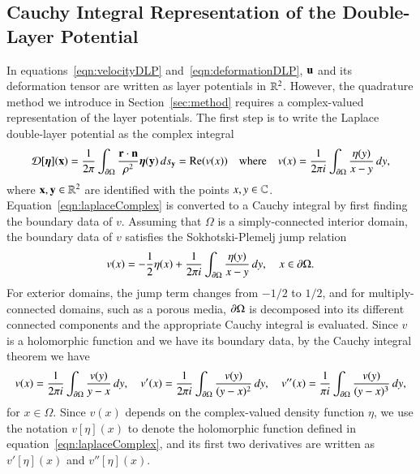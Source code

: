 \documentclass[preprint,10pt]{elsarticle}
\begin{document}
\subsection{Cauchy Integral Representation of the Double-Layer
Potential}
\label{sec:DLPcomplex}
In equations~\eqref{eqn:velocityDLP} and~\eqref{eqn:deformationDLP},
${\mathbf{u}}$ and its deformation tensor are written as layer potentials in
${\mathbb{R}}^2$.  However, the quadrature method we introduce in
Section~\ref{sec:method} requires a complex-valued representation of the
layer potentials. The first step is to write the Laplace double-layer
potential as the complex integral
\begin{align}
  {\mathcal{D}}[{\boldsymbol\eta}]({\mathbf{x}}) = \frac{1}{2\pi} \int_{{\partial}\Omega} 
    \frac{{\mathbf{r}} \cdot {\mathbf{n}}}{\rho^2}{\boldsymbol\eta}({\mathbf{y}})\, ds_{\mathbf{y}} = {\operatorname{Re}} (v(x)) \quad 
    \text{where} \quad v(x) = \frac{1}{2\pi i} \int_{{\partial}\Omega}
    \frac{\eta(y)}{x - y} \, dy,
  \label{eqn:laplaceComplex}
\end{align}
where ${\mathbf{x}},{\mathbf{y}} \in {\mathbb{R}}^2$ are identified with the points $x,y \in {\mathbb{C}}$.
Equation~\eqref{eqn:laplaceComplex} is converted to a Cauchy
integral by first finding the boundary data of $v$.  Assuming that
$\Omega$ is a simply-connected interior domain, the boundary data
of $v$ satisfies the Sokhotski-Plemelj jump relation
\begin{align}
  \label{eqn:SPrelation}
  v(x) = - \frac{1}{2} \eta(x) + \frac{1}{2\pi i} \int_{{\partial}\Omega}
    \frac{\eta(y)}{x-y}\, dy, \quad x \in {\partial}\Omega.
\end{align}
For exterior domains, the jump term changes from $-1/2$ to $1/2$, and
for multiply-connected domains, such as a porous media, ${\partial}\Omega$ is
decomposed into its different connected components and the appropriate
Cauchy integral is evaluated.  Since $v$ is a holomorphic function and
we have its boundary data, by the Cauchy integral theorem we have
\begin{align}
  \label{eqn:cauchy}
  v(x) = \frac{1}{2\pi i}\int_{{\partial}\Omega} 
    \frac{v(y)}{y-x} \,dy, \quad
  v'(x) = \frac{1}{2\pi i} \int_{{\partial}\Omega}
    \frac{v(y)}{(y-x)^2} \, dy, \quad
  v''(x) = \frac{1}{\pi i} \int_{{\partial}\Omega}
    \frac{v(y)}{(y-x)^3} \, dy,
\end{align}
for $x \in \Omega$.  Since $v(x)$ depends on the complex-valued density
function $\eta$, we use the notation $v[\eta](x)$ to denote the
holomorphic function defined in equation~\eqref{eqn:laplaceComplex}, and
its first two derivatives are written as $v'[\eta](x)$ and
$v''[\eta](x)$.  
  
\end{document}
